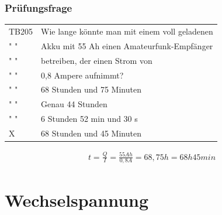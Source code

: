 \begin{frame}
    \frametitle{Prüfungsfrage}
    \begin{center}
    \begin{tabular}{l||l}\hline
        TB205 & Wie lange könnte man mit einem voll geladenen\\
        " " & Akku mit 55 Ah einen Amateurfunk-Empfänger\\ 
        " " & betreiben, der einen Strom von\\ 
        " " & 0,8 Ampere aufnimmt?\\ \hline\hline
         " " & 68 Stunden und 75 Minuten \\ \hline
         " " & Genau 44 Stunden \\ \hline
         " " & 6 Stunden 52 min und 30 s \\\hline
         X & 68 Stunden und 45 Minuten \\\hline
    \end{tabular}
        \begin{align} 
			t = \frac{Q}{I} = \frac{55 Ah}{0,8 A} = 68,75 h = 68 h 45 min
		\end{align}
 	\end{center}
 	
\end{frame}

\section*{Wechsel\-spannung}

